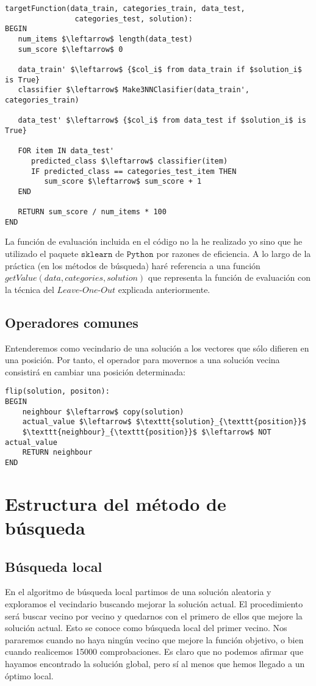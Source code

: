 \documentclass[11pt,leqno]{article}
\begin{document}
\begin{lstlisting}[mathescape=true]
targetFunction(data_train, categories_train, data_test,
				categories_test, solution):
BEGIN
   num_items $\leftarrow$ length(data_test)
   sum_score $\leftarrow$ 0
	
   data_train' $\leftarrow$ {$col_i$ from data_train if $solution_i$ is True}
   classifier $\leftarrow$ Make3NNClasifier(data_train', categories_train)

   data_test' $\leftarrow$ {$col_i$ from data_test if $solution_i$ is True}
	
   FOR item IN data_test'
      predicted_class $\leftarrow$ classifier(item)
      IF predicted_class == categories_test_item THEN
         sum_score $\leftarrow$ sum_score + 1
   END
	
   RETURN sum_score / num_items * 100 
END
\end{lstlisting}

	La función de evaluación incluida en el código no la he realizado yo sino que he utilizado el paquete $\texttt{sklearn}$ de $\texttt{Python}$ por razones de eficiencia. A lo largo de la práctica (en los métodos de búsqueda) haré referencia a una función $getValue(data, categories, solution)$ que representa la función de evaluación con la técnica del $\textit{Leave-One-Out}$ explicada anteriormente.
	
\subsection{Operadores comunes}
	Entenderemos como vecindario de una solución a los vectores que sólo difieren en una posición. Por tanto, el operador para movernos a una solución vecina consistirá en cambiar una posición determinada:
\begin{lstlisting}[mathescape=true]
flip(solution, positon):
BEGIN
	neighbour $\leftarrow$ copy(solution)
	actual_value $\leftarrow$ $\texttt{solution}_{\texttt{position}}$
	$\texttt{neighbour}_{\texttt{position}}$ $\leftarrow$ NOT actual_value
	RETURN neighbour
END
\end{lstlisting}
	

\section{Estructura del método de búsqueda}
\subsection{Búsqueda local}
	En el algoritmo de búsqueda local partimos de una solución aleatoria y exploramos el vecindario buscando mejorar la solución actual.
	El procedimiento será buscar vecino por vecino y quedarnos con el primero de ellos que mejore la 
	solución actual. Esto se conoce como búsqueda local del primer vecino. Nos pararemos cuando no haya ningún vecino que mejore la 
	función objetivo, o bien cuando realicemos 15000 comprobaciones. Es claro que no podemos afirmar que hayamos encontrado la
	solución global, pero sí al menos que hemos llegado a un óptimo local.
	
\end{document}
